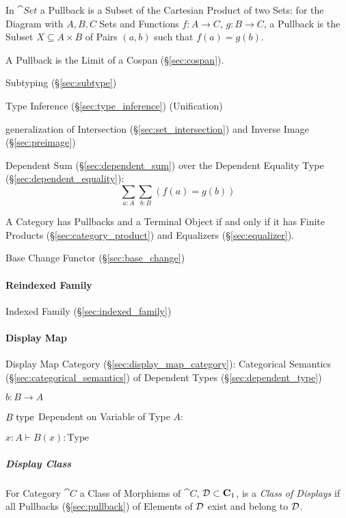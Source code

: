 In $\cat{Set}$ a Pullback is a Subset of the Cartesian Product of two
Sets: for the Diagram with $A,B,C$ Sets and Functions $f : A
\rightarrow C$, $g : B \rightarrow C$, a Pullback is the Subset $X
\subseteq A \times B$ of Pairs $(a,b)$ such that $f(a) = g(b)$.

A Pullback is the Limit of a Cospan (\S\ref{sec:cospan}).

Subtyping (\S\ref{sec:subtype})

Type Inference (\S\ref{sec:type_inference}) (Unification)

generalization of Intersection (\S\ref{sec:set_intersection}) and
Inverse Image (\S\ref{sec:preimage})

Dependent Sum (\S\ref{sec:dependent_sum}) over the Dependent Equality
Type (\S\ref{sec:dependent_equality}):
\[
  \sum_{a:A} \sum_{b:B} (f(a) = g(b))
\]

A Category has Pullbacks and a Terminal Object if and only if it has
Finite Products (\S\ref{sec:category_product}) and Equalizers
(\S\ref{sec:equalizer}). \cite{awodey06}

Base Change Functor (\S\ref{sec:base_change})



\paragraph{Reindexed Family}\label{sec:reindexed_family}\hfill

Indexed Family (\S\ref{sec:indexed_family})



\paragraph{Display Map}\label{sec:display_map}\hfill

Display Map Category (\S\ref{sec:display_map_category}): Categorical
Semantics (\S\ref{sec:categorical_semantics}) of Dependent Types
(\S\ref{sec:dependent_type})

$b : B \rightarrow A$

$B \;\mathrm{type}$ Dependent on Variable of Type $A$:

$x:A \vdash B(x):\mathrm{Type}$



\subparagraph{Display Class}\label{sec:display_class}\hfill

For Category $\cat{C}$ a Class of Morphisms of $\cat{C}$, $\mathcal{D}
\subset \mathbf{C}_1$, is a \emph{Class of Displays} if all Pullbacks
(\S\ref{sec:pullback}) of Elements of $\mathcal{D}$ exist and belong to
$\mathcal{D}$.




